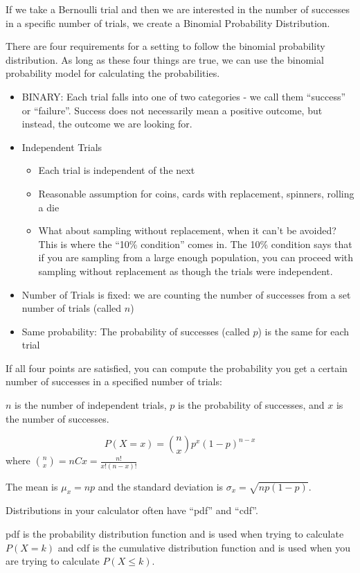 \documentclass[../stats.tex]{subfiles}
\begin{document}
If we take a Bernoulli trial and then we are interested in the number of successes in a specific number of trials, we create a Binomial Probability Distribution.

There are four requirements for a setting to follow the binomial probability distribution. As long as these four things are true, we can use the binomial probability model for calculating the probabilities.

\begin{itemize}
    \item BINARY: Each trial falls into one of two categories - we call them ``success'' or ``failure''. Success does not necessarily mean a positive outcome, but instead, the outcome we are looking for.
    \item Independent Trials
    \begin{itemize}
        \item Each trial is independent of the next 
        \item Reasonable assumption for coins, cards with replacement, spinners, rolling a die 
        \item What about sampling without replacement, when it can't be avoided? This is where the ``10\% condition'' comes in. The 10\% condition says that if you are sampling from a large enough population, you can proceed with sampling without replacement as though the trials were independent.
    \end{itemize}
    \item Number of Trials is fixed: we are counting the number of successes from a set number of trials (called $n$)
    \item Same probability: The probability of successes (called $p$) is the same for each trial 
\end{itemize}

If all four points are satisfied, you can compute the probability you get a certain number of successes in a specified number of trials:

$n$ is the number of independent trials, $p$ is the probability of successes, and $x$ is the number of successes. 

\[ P(X=x) = \binom{n}{x}p^x(1-p)^{n-x} \]
where $\binom{n}{x}=nCx = \frac{n!}{x!(n-x)!}$

The mean is $\mu_x = np$ and the standard deviation is $\sigma_x = \sqrt{np(1-p)}$.

Distributions in your calculator often have ``pdf'' and ``cdf''.

pdf is the probability distribution function and is used when trying to calculate $P(X=k)$ and cdf is the cumulative distribution function and is used when you are trying to calculate $P(X\leq k)$.
\end{document}
